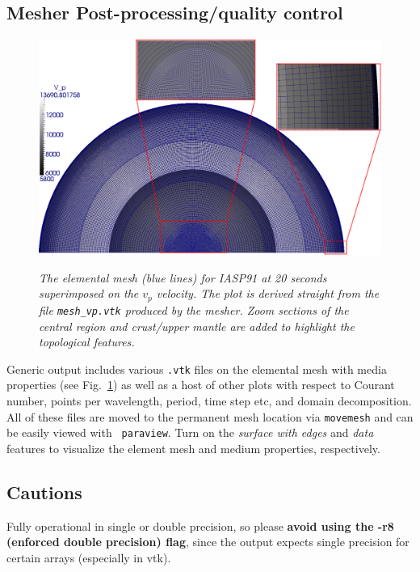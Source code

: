 \documentclass[11pt,letter,fleqn,english,notitlepage]{article}
\begin{document}
\subsection{Mesher Post-processing/quality control }
\begin{figure}[htb]
    \begin{center}\label{fig:mesh_vp}
        \includegraphics[scale=0.45]{mesh_vp_fig.pdf}
        \caption{\textit{The elemental mesh (blue lines) for IASP91 at 20
        seconds superimposed on the $v_p$ velocity.  The plot is derived
        straight from the file {\tt mesh\_vp.vtk} produced by the mesher. Zoom
        sections of the central region and crust/upper mantle are added to
        highlight the topological features.}}
    \end{center}
\end{figure}
%
\noindent Generic output includes various {\tt *.vtk} files on the elemental
mesh with media properties (see Fig.~\ref{fig:mesh_vp}) as well as a host of
other plots with respect to Courant number, points per wavelength, period, time
step etc, and domain decomposition.  All of these files are moved to the
permanent mesh location via {\tt movemesh} and can be easily viewed with {\tt
paraview}. Turn on the \textit{surface with edges} and \textit{data} features
to visualize the element mesh and medium properties, respectively.

\subsection{Cautions}
Fully operational in single or double precision, so please \textbf{avoid using
the -r8 (enforced double precision) flag}, since the output expects single
precision for certain arrays (especially in vtk).
\end{document}
